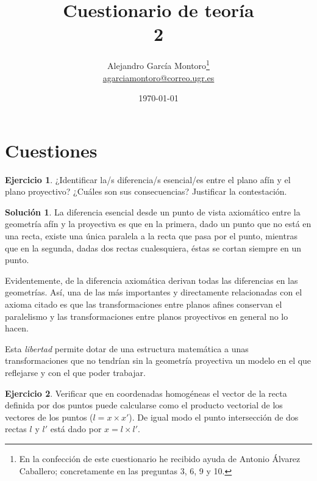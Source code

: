 \documentclass[a4paper, 11pt]{article}
\title{Cuestionario de teoría \\ 2}
\author{Alejandro García Montoro\footnote{En la confección de este cuestionario he recibido ayuda de Antonio Álvarez Caballero; concretamente en las preguntas 3, 6, 9 y 10.}\\
    \href{mailto:agarciamontoro@correo.ugr.es}{agarciamontoro@correo.ugr.es}}
\date{\today}
\theoremstyle{definition}
\newtheorem{ejercicio}{Ejercicio}
\newtheorem*{solucion}{Solución}
\theoremstyle{theorem}
\begin{document}
  \maketitle

  \section{Cuestiones}

  \begin{ejercicio}
      ¿Identificar la/s diferencia/s esencial/es entre el plano afín y el plano proyectivo? ¿Cuáles son sus consecuencias? Justificar la contestación.
  \end{ejercicio}

  \begin{solucion}
      La diferencia esencial desde un punto de vista axiomático entre la geometría afín y la proyectiva es que en la primera, dado un punto que no está en una recta, existe una única paralela a la recta que pasa por el punto, mientras que en la segunda, dadas dos rectas cualesquiera, éstas se cortan siempre en un punto.

      Evidentemente, de la diferencia axiomática derivan todas las diferencias en las geometrías. Así, una de las más importantes y directamente relacionadas con el axioma citado es que las transformaciones entre planos afines conservan el paralelismo y las transformaciones entre planos proyectivos en general no lo hacen.

      Esta \emph{libertad} permite dotar de una estructura matemática a unas transformaciones que no tendrían sin la geometría proyectiva un modelo en el que reflejarse y con el que poder trabajar.
  \end{solucion}

  \begin{ejercicio}
      Verificar que en coordenadas homogéneas el vector de la recta definida por dos puntos puede calcularse como el producto vectorial de los vectores de los puntos ($l = x \times x'$). De igual modo el punto intersección de dos rectas $l$ y $l'$ está dado por $x = l \times l'$.
  \end{ejercicio}
\end{document}
